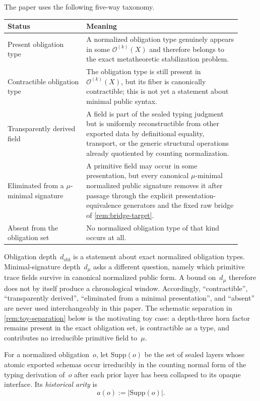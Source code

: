\documentclass{lmcs}
\newcommand{\Ocal}{\mathcal{O}}
\newcommand{\Supp}{\mathrm{Supp}}
\begin{document}
\begin{rem}
\label{rem:present-vs-cost}
The paper uses the following five-way taxonomy.
\begin{center}
\small
\begin{tabular}{@{}p{0.31\linewidth}p{0.61\linewidth}@{}}
\toprule
Status & Meaning \\
\midrule
Present obligation type & A normalized obligation type genuinely appears in some $\Ocal^{(k)}(X)$ and therefore belongs to the exact metatheoretic stabilization problem. \\
Contractible obligation type & The obligation type is still present in $\Ocal^{(k)}(X)$, but its fiber is canonically contractible; this is not yet a statement about minimal public syntax. \\
Transparently derived field & A field is part of the sealed typing judgment but is uniformly reconstructible from other exported data by definitional equality, transport, or the generic structural operations already quotiented by counting normalization. \\
Eliminated from a $\mu$-minimal signature & A primitive field may occur in some presentation, but every canonical $\mu$-minimal normalized public signature removes it after passage through the explicit presentation-equivalence generators and the fixed raw bridge of \autoref{rem:bridge-target}. \\
Absent from the obligation set & No normalized obligation type of that kind occurs at all. \\
\bottomrule
\end{tabular}
\end{center}
Obligation depth~$d_{\mathrm{obl}}$ is a statement about exact normalized obligation types. Minimal-signature depth~$d_\mu$ asks a different question, namely which primitive trace fields survive in canonical normalized public form. A bound on~$d_\mu$ therefore does not by itself produce a chronological window. Accordingly, ``contractible'', ``transparently derived'', ``eliminated from a minimal presentation'', and ``absent'' are never used interchangeably in this paper. The schematic separation in \autoref{rem:toy-separation} below is the motivating toy case: a depth-three horn factor remains present in the exact obligation set, is contractible as a type, and contributes no irreducible primitive field to~$\mu$.
\end{rem}

\begin{defi}
\label{def:arity}
For a normalized obligation~$o$, let $\Supp(o)$ be the set of sealed layers whose atomic exported schemas occur irreducibly in the counting normal form of the typing derivation of~$o$ after each prior layer has been collapsed to its opaque interface. Its \emph{historical arity} is
\[
  a(o) := |\Supp(o)|.
\]
\end{defi}
\end{document}
